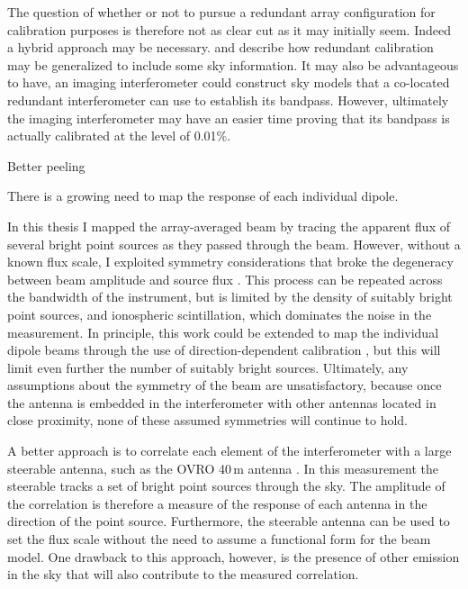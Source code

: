 \begin{bibunit}
The question of whether or not to pursue a redundant array configuration for calibration purposes is
therefore not as clear cut as it may initially seem.  Indeed a hybrid approach may be necessary.
\citet{2010MNRAS.408.1029L} and \citet{2017arXiv170101860S} describe how redundant calibration may
be generalized to include some sky information.  It may also be advantageous to have, an imaging
interferometer could construct sky models that a co-located redundant interferometer can use to
establish its bandpass. However, ultimately the imaging interferometer may have an easier time
proving that its bandpass is actually calibrated at the level of 0.01\%.

Better peeling

There is a growing need to map the response of each individual dipole.

In this thesis I mapped the array-averaged beam by tracing the apparent flux of several bright point
sources as they passed through the beam. However, without a known flux scale, I exploited symmetry
considerations that broke the degeneracy between beam amplitude and source flux \citep[inspired
by][]{2012AJ....143...53P}. This process can be repeated across the bandwidth of the instrument, but
is limited by the density of suitably bright point sources, and ionospheric scintillation, which
dominates the noise in the measurement. In principle, this work could be extended to map the
individual dipole beams through the use of direction-dependent calibration
\citep{2008ISTSP...2..707M}, but this will limit even further the number of suitably bright sources.
Ultimately, any assumptions about the symmetry of the beam are unsatisfactory, because once the
antenna is embedded in the interferometer with other antennas located in close proximity, none of
these assumed symmetries will continue to hold.

A better approach is to correlate each element of the interferometer with a large steerable antenna,
such as the OVRO 40\,m antenna \citep[e.g.,][]{2016SPIE.9906E..0DB}. In this measurement the
steerable tracks a set of bright point sources through the sky. The amplitude of the correlation is
therefore a measure of the response of each antenna in the direction of the point source.
Furthermore, the steerable antenna can be used to set the flux scale without the need to assume a
functional form for the beam model. One drawback to this approach, however, is the presence of other
emission in the sky that will also contribute to the measured correlation.


\end{bibunit}
